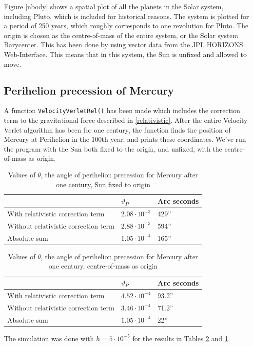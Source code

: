     Figure \ref{nbody} shows a spatial plot of all the planets in the Solar system, including Pluto, which is included for historical reasons. The system is plotted for a period of 250 years, which roughly corresponds to one revolution for Pluto. The origin is chosen as the centre-of-mass of the entire system, or the Solar system Barycenter. This has been done by using vector data from the JPL HORIZONS Web-Interface\cite{horizons}. This means that in this system, the Sun is unfixed and allowed to move.
    
    \subsection{Perihelion precession of Mercury}
    A function \texttt{VelocityVerletRel()} has been made which includes the correction term to the gravitational force described in \eqref{relativistic}. After the entire Velocity Verlet algorithm has been for one century, the function finds the position of Mercury at Perihelion in the 100th year, and prints these coordinates. We've run the program with the Sun both fixed to the origin, and unfixed, with the centre-of-mass as origin.
    
    \begin{table}[H]
		\centering
		\caption{Values of $\theta$, the angle of perihelion precession for Mercury after one century, Sun fixed to origin}
		\label{thetatableunfixed}
		\begin{tabular}{|l|l|l|}
		    \hline
			 & $\vartheta_P$ & Arc seconds\\
			\hline
			With relativistic correction term & $2.08\cdot10^{-3}$ & 429''\\
			Without relativistic correction term & $2.88\cdot10^{-3}$ & 594'' \\
			Absolute sum & $1.05\cdot10^{-4}$ & 165''\\
			\hline
	    \end{tabular}
	\end{table}
    
    \begin{table}[H]
		\centering
		\caption{Values of $\theta$, the angle of perihelion precession for Mercury after one century, centre-of-mass as origin}
		\label{thetatablefixed}
		\begin{tabular}{|l|l|l|}
		    \hline
			 & $\vartheta_P$ & Arc seconds\\
			\hline
			With relativistic correction term & $4.52\cdot10^{-4}$ & 93.2''\\
			Without relativistic correction term & $3.46\cdot10^{-4}$ & 71.2'' \\
			Absolute sum & $1.05\cdot10^{-4}$ & 22''\\
			\hline
		\end{tabular}
	\end{table}
	

	
The simulation was done with $h = 5\cdot10^{-5}$ for the results in Tables \ref{thetatablefixed} and \ref{thetatableunfixed}.
	
	
    
